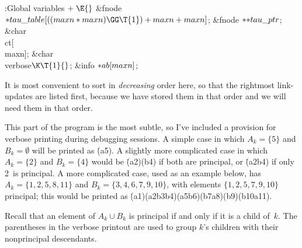 \B{}:Global variables\X${}\mathrel+\E{}$\6
\&{fnode} ${}{*}\\{tau\_table}[((\\{maxn}*\\{maxn})\GG\T{1})+\\{maxn}+%
\\{maxn}]{}$;\6
\&{fnode} ${}{*}{*}\\{tau\_ptr}{}$;\6
\&{char} \\{ct}[\\{maxn}];\6
\&{char} \\{verbose}${}\K\T{1}{}$;\6
\&{info} ${}{*}\\{ab}[\\{maxn}]{}$;\par
\fi

It is most convenient to sort in {\it decreasing\/} order here,
so that the rightmost link-updates are listed first, because we have
stored them in that order and we will need them in that order.

This part of the program is the most subtle, so I've included a
provision for verbose printing during debugging sessions.
A simple case in which $A_k=\{5\}$ and $B_k=\emptyset$ will be
printed as \.{(a5)}. A slightly more complicated case in which
$A_k=\{2\}$ and $B_k=\{4\}$ would be \.{(a2)(b4)} if both are
principal, or \.{(a2b4)} if only 2~is principal. A more complicated
case, used as an example below, has $A_k=\{1,2,5,8,11\}$ and
$B_k=\{3,4,6,7,9,10\}$, with elements $\{1,2,5,7,9,10\}$ principal;
this would be printed as \.{(a1)(a2b3b4)(a5b6)(b7a8)(b9)(b10a11)}.

Recall that an element  of $A_k\cup B_k$ is principal if and only if
it is a child of~$k$. The parentheses in the verbose printout
are used to group $k$'s children with their nonprincipal descendants.

